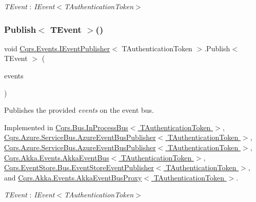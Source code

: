 \begin{Desc}
\item[Type Constraints]\begin{description}
\item[{\em T\+Event} : {\em I\+Event$<$T\+Authentication\+Token$>$}]\end{description}
\end{Desc}
\mbox{\label{interfaceCqrs_1_1Events_1_1IEventPublisher_a2cbcc3d2c24d015abef6337714ec51ff_a2cbcc3d2c24d015abef6337714ec51ff}} 
\subsubsection{\texorpdfstring{Publish$<$ T\+Event $>$()}{Publish< TEvent >()}\hspace{0.1cm}{\footnotesize\ttfamily [2/2]}}
{\footnotesize\ttfamily void \hyperlink{interfaceCqrs_1_1Events_1_1IEventPublisher}{Cqrs.\+Events.\+I\+Event\+Publisher}$<$ T\+Authentication\+Token $>$.Publish$<$ T\+Event $>$ (\begin{DoxyParamCaption}\item[{I\+Enumerable$<$ T\+Event $>$}]{events }\end{DoxyParamCaption})}



Publishes the provided {\itshape events}  on the event bus. 



Implemented in \hyperlink{classCqrs_1_1Bus_1_1InProcessBus_ae154f274db2a028a6094677d83cc1c74_ae154f274db2a028a6094677d83cc1c74}{Cqrs.\+Bus.\+In\+Process\+Bus$<$ T\+Authentication\+Token $>$}, \hyperlink{classCqrs_1_1Azure_1_1ServiceBus_1_1AzureEventBusPublisher_a8bb9cd1172e7dec117cde75eb6b0f056_a8bb9cd1172e7dec117cde75eb6b0f056}{Cqrs.\+Azure.\+Service\+Bus.\+Azure\+Event\+Bus\+Publisher$<$ T\+Authentication\+Token $>$}, \hyperlink{classCqrs_1_1Azure_1_1ServiceBus_1_1AzureEventBusPublisher_a8bb9cd1172e7dec117cde75eb6b0f056_a8bb9cd1172e7dec117cde75eb6b0f056}{Cqrs.\+Azure.\+Service\+Bus.\+Azure\+Event\+Bus\+Publisher$<$ T\+Authentication\+Token $>$}, \hyperlink{classCqrs_1_1Akka_1_1Events_1_1AkkaEventBus_ad5b996dd77efbf51a2b5a32f94417772_ad5b996dd77efbf51a2b5a32f94417772}{Cqrs.\+Akka.\+Events.\+Akka\+Event\+Bus$<$ T\+Authentication\+Token $>$}, \hyperlink{classCqrs_1_1EventStore_1_1Bus_1_1EventStoreEventPublisher_a85b4922ff01b088b01b39463681c6eb6_a85b4922ff01b088b01b39463681c6eb6}{Cqrs.\+Event\+Store.\+Bus.\+Event\+Store\+Event\+Publisher$<$ T\+Authentication\+Token $>$}, and \hyperlink{classCqrs_1_1Akka_1_1Events_1_1AkkaEventBusProxy_af4c202eaab00ed2fb6160d5b114d935c_af4c202eaab00ed2fb6160d5b114d935c}{Cqrs.\+Akka.\+Events.\+Akka\+Event\+Bus\+Proxy$<$ T\+Authentication\+Token $>$}.

\begin{Desc}
\item[Type Constraints]\begin{description}
\item[{\em T\+Event} : {\em I\+Event$<$T\+Authentication\+Token$>$}]\end{description}
\end{Desc}
